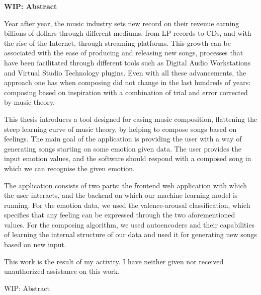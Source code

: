 \thispagestyle{plain}
\begin{center}
    \Large
    \textbf{WIP: Abstract}

    \vspace{0.4cm}


\end{center}
Year after year, the music industry sets new record on their revenue
earning billions of dollars through different mediums,
from LP records to  CDs, and with the rise of the Internet,
through streaming platforms.
This growth can be associated with the ease of producing
and releasing new songs, processes that have been facilitated
through different tools such as Digital Audio Workstations
and Virtual Studio Technology plugins. Even with all these advancements,
the approach one has when composing did not change in the last hundreds of
years: composing based on inspiration with a combination of
trial and error corrected by music theory.

This thesis introduces a tool designed for easing music composition,
flattening the steep learning curve of music theory,
by helping to compose songs based on feelings.
The main goal of the application is providing the user with a way of
generating songs starting on some emotion given data.
The user provides the input emotion values,
and the software should respond with a composed song in which we can
recognise the given emotion.

The application consists of two parts:
the frontend web application with which the user interacts,
and the backend on which our machine learning model is running.
For the emotion data, we used the valence-arousal classification,
which specifies that any feeling can be expressed through the two aforementioned
values. For the composing algorithm, we used autoencoders
and their capabilities of learning the internal structure of our
data and used it for generating new songs based on new input.

This work is the result of my activity.
I have neither given nor received unauthorized assistance on this work.


WIP: Abstract
